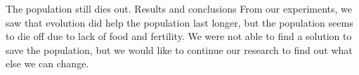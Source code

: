 \documentclass[11pt]{article}
\begin{document}
\begin{multicols}{2}
The population still dies out. \newline
\center 
Results and conclusions
\flushleft
From our experiments, we saw that evolution did help the population last longer, but the population seems to die off due to lack of food and fertility. We were not able to find a solution to save the population, but we would like to continue our research to find out what else we can change.









\end{multicols}
\end{document}
